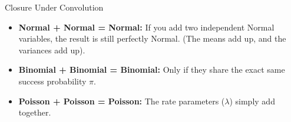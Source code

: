 \documentclass[11pt]{article}
\theoremstyle{smallexample}
\begin{document}
\begin{defbox}{Closure Under Convolution}
\begin{itemize}
    \item \textbf{Normal + Normal = Normal:} If you add two independent Normal variables, the result is still perfectly Normal. (The means add up, and the variances add up).
    \item \textbf{Binomial + Binomial = Binomial:} Only if they share the exact same success probability $\pi$.
    \item \textbf{Poisson + Poisson = Poisson:} The rate parameters ($\lambda$) simply add together.
\end{itemize}
\end{defbox}
\end{document}
